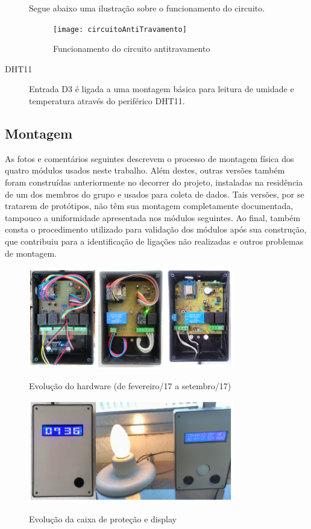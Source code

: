 \begin{description}
Segue abaixo uma ilustração sobre o funcionamento do circuito.

\begin{figure}[H]
	\centering
	\caption{Funcionamento do circuito antitravamento}
  \texttt{[image: circuitoAntiTravamento]}
\label{fig:circuitoAntiTravamento}
\end{figure}

\item [DHT11] Entrada D3 é ligada a uma montagem básica para leitura de umidade e temperatura através do periférico DHT11.

\end{description}

\subsection {Montagem}

As fotos e comentários seguintes descrevem o processo de montagem física dos quatro módulos usados neste trabalho. Além destes, outras versões também foram construídas anteriormente no decorrer do projeto, instaladas na residência de um dos membros do grupo e usados para coleta de dados. Tais versões, por se tratarem de protótipos, não têm sua montagem completamente documentada, tampouco a uniformidade apresentada nos módulos seguintes.
Ao final, também consta o procedimento utilizado para validação dos módulos após sua construção, que contribuiu para a identificação de ligações não realizadas e outros problemas de montagem.

\begin{figure}[H]
	\centering
	\caption{Evolução do hardware (de fevereiro/17 a setembro/17)}
	\includegraphics[width=0.8\textwidth]{evolHW}
	\label{fig:evolHW}
\end{figure}

\begin{figure}[H]
	\centering
	\caption{Evolução da caixa de proteção e display}
	\includegraphics[width=0.8\textwidth]{evolProtDisplay}
	\label{fig:evolProtDisplay}
\end{figure}

